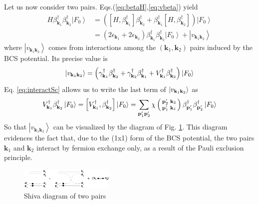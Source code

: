 \documentclass[aps,prb,superscriptaddress,twocolumn]{revtex4}
\newcommand{\vk}{\ensuremath{\mathbf{k}}}
\newcommand{\vp}{\ensuremath{\mathbf{p}}}
\begin{document}
Let us now consider two pairs. Eqs.(\ref{eq:betaH},\ref{eq:vbeta}) yield 
\begin{equation}  \label{eq:SchTwo}
\begin{split}
H\beta^{\dagger}_{\mathbf{k} _1}\beta^{\dagger}_{\mathbf{k}
_2}\left|F_0\right>   &=\left(\left[H,\beta^{\dagger}_{\mathbf{k} _1}\right]
\beta^{\dagger}_{\mathbf{k} _2}+\beta^{\dagger}_{\mathbf{k} _1}\left[%
H,\beta^{\dagger}_{\mathbf{k} _2}\right]  \right) \left|F_0\right>   \\
&=\left(2\epsilon_{\mathbf{k} _1}+2\epsilon_{\mathbf{k} _2}\right)
\beta^{\dagger}_{\mathbf{k} _1}\beta^{\dagger}_{\mathbf{k}
_2}\left|F_0\right>  +\left|v_{\mathbf{k} _1\mathbf{k} _2}\right> 
\end{split}%
\end{equation}
where $\left|v_{\mathbf{k} _1\mathbf{k} _2}\right> $ comes from interactions
among the $\left(\mathbf{k} _1,\mathbf{k} _2\right) $ pairs induced by the
BCS potential. Its precise value is 
\begin{equation}
\left|v_{\mathbf{k} _1\mathbf{k} _2}\right> =\left(\gamma^{\dagger}_{\mathbf{%
k} _1}\beta^{\dagger}_{\mathbf{k} _2}+\gamma^{\dagger}_{\mathbf{k}
_2}\beta^{\dagger}_{\mathbf{k} _1}+V^{\dagger}_{\mathbf{k}
_1}\beta^{\dagger}_{\mathbf{k} _2}\right) \left|F_0\right>  
\end{equation}
Eq. \eqref{eq:interactSc} allows us to write the last term of $\left|v_{%
\mathbf{k} _1\mathbf{k} _2}\right> $ as 
\begin{equation}
V^{\dagger}_{\mathbf{k} _1}\beta^{\dagger}_{\mathbf{k} _2}\left|F_0\right>  =%
\left[V^{\dagger}_{\mathbf{k} _1},\beta^{\dagger}_{\mathbf{k} _2}\right] 
\left|F_0\right>  = \sum_{\mathbf{p} ^{\prime}_1\mathbf{p}
^{\prime}_2}\chi\left(\begin{smallmatrix}\vp'_2&\vk_2\\\vp'_1&\vk_1%
\end{smallmatrix}\right)  \beta^{\dagger}_{\mathbf{p} ^{\prime}_1}\beta^{%
\dagger}_{\mathbf{p} ^{\prime}_2}\left|F_0\right>  
\end{equation}
So that $\left|v_{\mathbf{k} _1\mathbf{k} _2}\right> $ can be visualized by
the diagram of Fig. \ref{fig:twoP}. This diagram evidences the fact that,
due to the (1x1) form of the BCS potential, the two pairs $\mathbf{k} _1$
and $\mathbf{k} _2$ interact by fermion exchange only, as a result of the
Pauli exclusion principle.

\begin{figure}[htb]
   \includegraphics[width=0.4\textwidth]{twoPair.eps}
\caption{Shiva diagram of two pairs }
\label{fig:twoP}
\end{figure}
\end{document}
